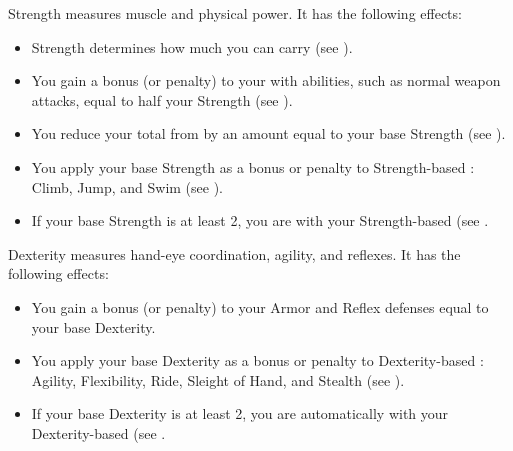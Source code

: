         \label{Strength}
        {
            Strength measures muscle and physical power.
            It has the following effects:
            \begin{itemize}
                \item Strength determines how much you can carry (see ).
                \item You gain a bonus (or penalty) to your  with  abilities, such as normal weapon attacks, equal to half your Strength (see ).
                \item You reduce your total  from  by an amount equal to your base Strength (see ).
                \item You apply your base Strength as a bonus or penalty to Strength-based : Climb, Jump, and Swim (see ).
                \item If your base Strength is at least 2, you are  with your Strength-based  (see .
            \end{itemize}
        }

        \label{Dexterity}
        {
            Dexterity measures hand-eye coordination, agility, and reflexes.
            It has the following effects:
            \begin{itemize}
                \item You gain a bonus (or penalty) to your Armor and Reflex defenses equal to your base Dexterity.
                \item You apply your base Dexterity as a bonus or penalty to Dexterity-based : Agility, Flexibility, Ride, Sleight of Hand, and Stealth (see ).
                \item If your base Dexterity is at least 2, you are automatically  with your Dexterity-based  (see .
            \end{itemize}
        }

